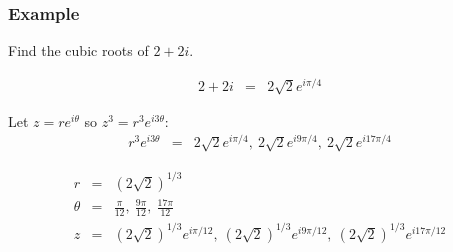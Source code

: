\begin{frame}
  \frametitle{Example}

  Find the cubic roots of $2+2i$.

  \begin{eqnarray*}
    2 + 2i & = & 2\sqrt{2} e^{i\pi/4}
  \end{eqnarray*}

  Let $z=re^{i\theta}$ so $z^3=r^3e^{i3\theta}$:
  \begin{eqnarray*}
    r^3e^{i3\theta} & = & 2\sqrt{2} e^{i\pi/4}, ~ 2\sqrt{2} e^{i9\pi/4}, ~ 2\sqrt{2} e^{i17\pi/4}
  \end{eqnarray*}

  \begin{eqnarray*}
    r & = & (2\sqrt{2})^{1/3} \\
    \theta & = & \frac{\pi}{12}, ~ \frac{9\pi}{12}, ~ \frac{17\pi}{12} \\
    z & = & (2\sqrt{2})^{1/3} e^{i\pi/12}, ~ (2\sqrt{2})^{1/3} e^{i9\pi/12}, ~ (2\sqrt{2})^{1/3} e^{i17\pi/12}
  \end{eqnarray*}

\end{frame}



